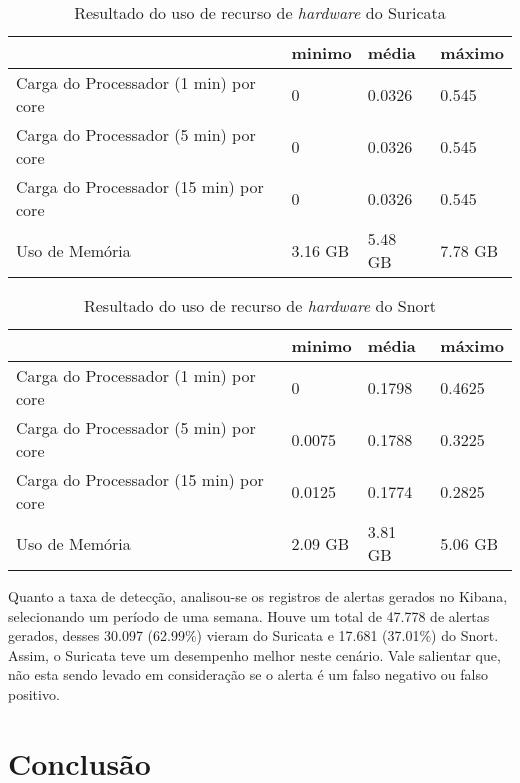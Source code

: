 \begin{table}[!htb]
\ABNTEXfontereduzida
\centering
\caption{Resultado do uso de recurso de \textit{hardware} do Suricata}
\label{tab:suricata-recursos}
\begin{tabular}{|M{5cm}|M{2cm}|M{2cm}|M{2cm}|}
    \hline
     & \textbf{minimo} & \textbf{média} & \textbf{máximo} \\
    \hline
    Carga do Processador (1 min) por core & 0 & 0.0326 & 0.545 \\
    \hline
    Carga do Processador (5 min) por core & 0 & 0.0326 & 0.545 \\
    \hline
    Carga do Processador (15 min) por core & 0 & 0.0326 & 0.545 \\
    \hline
    Uso de Memória & 3.16 GB & 5.48 GB & 7.78 GB \\
    \hline
\end{tabular}
\end{table}

\begin{table}[!htb]
\ABNTEXfontereduzida
\centering
\caption{Resultado do uso de recurso de \textit{hardware} do Snort}
\label{tab:snort-recursos}
\begin{tabular}{|M{5cm}|M{2cm}|M{2cm}|M{2cm}|}
    \hline
     & \textbf{minimo} & \textbf{média} & \textbf{máximo} \\
    \hline
    Carga do Processador (1 min) por core & 0 & 0.1798 & 0.4625 \\
    \hline
    Carga do Processador (5 min) por core & 0.0075 & 0.1788 & 0.3225 \\
    \hline
    Carga do Processador (15 min) por core & 0.0125 & 0.1774 & 0.2825 \\
    \hline
    Uso de Memória & 2.09 GB & 3.81 GB & 5.06 GB \\
    \hline
\end{tabular}
\end{table}

Quanto a taxa de detecção, analisou-se os registros de alertas gerados no Kibana, selecionando um período de uma semana. Houve um total de 47.778 de alertas gerados, desses 30.097 (62.99\%) vieram do Suricata e 17.681 (37.01\%) do Snort. Assim, o Suricata teve um desempenho melhor neste cenário. Vale salientar que, não esta sendo levado em consideração se o alerta é um falso negativo ou falso positivo.

\section{Conclusão} \label{sec:conclusão}

